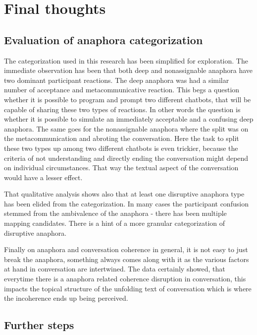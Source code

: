 \documentclass[12pt]{report}
\begin{document}
{%




\chapter{Final thoughts}

\section{Evaluation of anaphora categorization}

    The categorization used in this research has been simplified for exploration.
    The immediate observation has been that both deep and nonassignable anaphora
    have two dominant participant reactions.
    The deep anaphora was had a similar number of acceptance and metacommunicative reaction.
    This begs a question whether it is possible to program and prompt two different chatbots,
    that will be capable of sharing these two types of reactions.
    In other words the question is whether it is possible to simulate an immediately acceptable
    and a confusing deep anaphora.
    The same goes for the nonassignable anaphora
    where the split was on the metacommunication and abroting the conversation.
    Here the task to split these two types up among two different chatbots is even trickier,
    because the criteria of not understanding and directly ending the conversation might depend on
    individual circumstances.
    That way the textual aspect of the conversation would have a lesser effect.

    That qualitative analysis shows also that
    at least one disruptive anaphora type has been elided from the categorization.
    In many cases the participant confusion stemmed from the ambivalence of the anaphora -
    there has been multiple mapping candidates.
    There is a hint of a more granular categorization of disruptive anaphora.

    Finally on anaphora and conversation coherence in general,
    it is not easy to just break the anaphora,
    something always comes along with it as the various factors at hand in conversation are intertwined.
    The data certainly showed, that everytime there is a anaphora related coherence disruption in conversation,
    this impacts the topical structure of the unfolding text of conversation
    which is where the incoherence ends up being perceived.

\section{Further steps}


}
\end{document}
